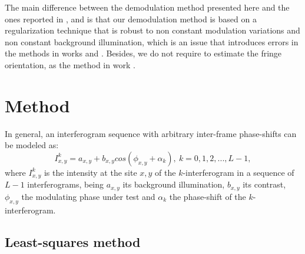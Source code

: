\documentclass[letterpaper,12pt]{article}   %
\begin{document}
The main difference between the demodulation method presented here and the ones reported 
in  \cite{a14},\cite{a15} and \cite{a17} is that our demodulation method is based on a 
regularization technique that is robust to non constant modulation variations and non 
constant background illumination, which is an issue that introduces errors in the methods 
in works \cite{a14} and \cite{a15}. Besides, we do not require to estimate the fringe 
orientation, as the method in work \cite{a17}.

\section{Method}

In general, an interferogram sequence with arbitrary inter-frame phase-shifts can be
modeled as:
\begin{equation}\label{I_k1}
	I_{x,y}^k=a_{x,y}+b_{x,y}cos(\phi_{x,y}+\alpha_k),\: k=0,1,2,...,L-1,
\end{equation}
where $I_{x,y}^k$ is the intensity at the site $x,y$ of the $k$-interferogram in a 
sequence of $L-1$ interferograms, being $a_{x,y}$ its background illumination, $b_{x,y}$
its contrast, $\phi_{x,y}$ the modulating phase under test and $\alpha_k$ the phase-shift
of the $k$-interferogram.

\subsection{Least-squares method}
\end{document}
